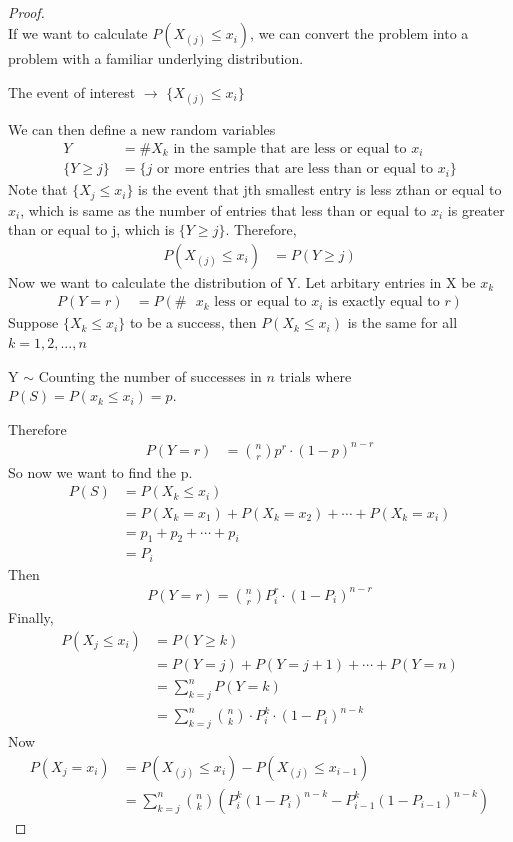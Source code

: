 \documentclass[11pt,oneside]{book}
\theoremstyle{break}
\theoremstyle{break}
\begin{document}
\hfill\\
\begin{proof}
\hfill\\
If we want to calculate $P(X_{(j)}\leq x_i)$, we can convert the problem into a problem with a familiar underlying distribution.\begin{center}
The event of interest $\longrightarrow$ $\{X_{(j)}\leq x_i\}$\\
\end{center}
We can then define a new random variables \begin{align*}
Y&=\#\text{}X_{k}\text{ in the sample that are less or equal to }x_i\\
\{Y\geq j\}&=\{j \text{ or more entries} \text{ that are less than or equal to }x_i \}
\end{align*}
Note that $\{X_{j}\leq x_i\}$ is the event that jth smallest entry is less zthan or equal to $x_i$, which is same as the number of entries that less than or equal to $x_i$ is greater than or equal to j, which is $\{Y\geq j\}$. Therefore, \begin{align*}
P(X_{(j)}\leq x_i)&= P(Y\geq j)
\end{align*}
Now we want to calculate the distribution of Y. Let arbitary entries in X be $x_k$ \begin{align*}
P(Y=r)&=P(\#\text{ }x_k\text{ less or equal to }x_i \text{ is exactly equal to }r  )
\end{align*}
Suppose $\{X_k\leq x_i \}$ to be a success, then $
P(X_k\leq x_i)$ is the same for all $k=1,2,...,n$\begin{center}
Y $\sim$ Counting the number of successes in $n$ trials where $P(S)=P(x_k\leq x_i)=p$.
\end{center}
Therefore \begin{align*}
P(Y=r)&=\binom nr p^r \cdot (1-p)^{n-r}
\end{align*}
So now we want to find the p. \begin{align*}
P(S)&= P(X_k\leq x_i)\\
&=P(X_k=x_1)+P(X_k=x_2)+\cdots+P(X_k=x_i)\\
&=p_1+p_2+\cdots+p_i\\
&=P_i
\end{align*}
Then\begin{align*}
P(Y=r)=\binom nr P_i^r \cdot (1-P_i)^{n-r}
\end{align*}
Finally, \begin{align*}
P(X_{j}\leq x_i)&=P(Y\geq k)\\
&=P(Y=j)+P(Y=j+1)+\cdots + P(Y=n)\\
&=\sum_{k=j}^n P(Y=k)\\
&=\sum_{k=j}^n \binom nk \cdot P_i^k \cdot (1-P_i)^{n-k}
\end{align*}
Now \begin{align*}
P(X_{j}=x_i)&=P(X_{(j)}\leq x_i)-P(X_{(j)}\leq x_{i-1})\\
&=\sum_{k=j}^{n}\binom nk \left( P_i^{k} (1-P_i)^{n-k}-P_{i-1}^k(1-P_{i-1})^{n-k}\right)
\end{align*}
\end{proof}
\end{document}
